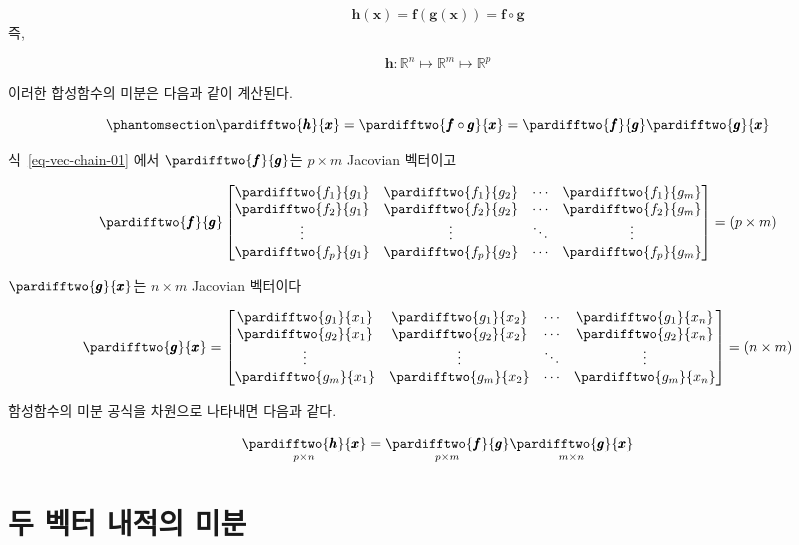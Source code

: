 \documentclass[
  11pt,
  a4paper,
  oneside]{scrbook}
\newcommand{\RR}{\mathbb{R}}
\theoremstyle{definition}
\theoremstyle{definition}
\theoremstyle{plain}
\theoremstyle{remark}
\begin{document}
\[ \pmb h( \pmb x) = \pmb f( \pmb g( \pmb x)) = \pmb f \circ \pmb g\]
즉,

\[ 
\pmb h : \RR^n \mapsto \RR^m \mapsto \RR^p
\]

이러한 합성함수의 미분은 다음과 같이 계산된다.

\begin{equation}\phantomsection\label{eq-vec-chain-01}{
\pardifftwo{ \pmb h}{\pmb x} = \pardifftwo{ \pmb f \circ \pmb g}{\pmb x} = \pardifftwo{ \pmb f}{\pmb g} \pardifftwo{ \pmb g}{\pmb x}
}\end{equation}

식~\ref{eq-vec-chain-01} 에서 \(\pardifftwo{ \pmb f}{\pmb g}\)는
\(p \times m\) Jacovian 벡터이고

\[ 
\pardifftwo{ \pmb f}{\pmb g} 
\begin{bmatrix}
\pardifftwo{  f_1}{ g_1} &  \pardifftwo{  f_1}{ g_2} & \cdots &  \pardifftwo{  f_1}{ g_m} \\
\pardifftwo{  f_2}{ g_1} &  \pardifftwo{  f_2}{ g_2} & \cdots &  \pardifftwo{  f_2}{ g_m} \\
\vdots & \vdots & \ddots & \vdots \\
\pardifftwo{  f_p}{ g_1} &  \pardifftwo{  f_p}{ g_2} & \cdots &  \pardifftwo{  f_p}{ g_m} \\
\end{bmatrix}
=(p \times m)
\]

\(\pardifftwo{ \pmb g}{\pmb x}\)는 \(n \times m\) Jacovian 벡터이다

\[
\pardifftwo{ \pmb g}{\pmb x} =
\begin{bmatrix}
\pardifftwo{  g_1}{ x_1} &  \pardifftwo{  g_1}{ x_2} & \cdots &  \pardifftwo{  g_1}{ x_n} \\
\pardifftwo{  g_2}{ x_1} &  \pardifftwo{  g_2}{ x_2} & \cdots &  \pardifftwo{  g_2}{ x_n} \\
\vdots & \vdots & \ddots & \vdots \\
\pardifftwo{  g_m}{ x_1} &  \pardifftwo{  g_m}{ x_2} & \cdots &  \pardifftwo{  g_m}{ x_n} \\
\end{bmatrix}
= (n \times m)
\]

함성함수의 미분 공식을 차원으로 나타내면 다음과 같다.

\[
\underset{ p \times n} {\pardifftwo{ \pmb h}{\pmb x}} = \underset{ p \times m} {\pardifftwo{ \pmb f}{\pmb g}} \underset{ m \times n} {\pardifftwo{ \pmb g}{\pmb x}}
\]

\section{두 벡터 내적의
미분}\label{uxb450-uxbca1uxd130-uxb0b4uxc801uxc758-uxbbf8uxbd84}
\end{document}
